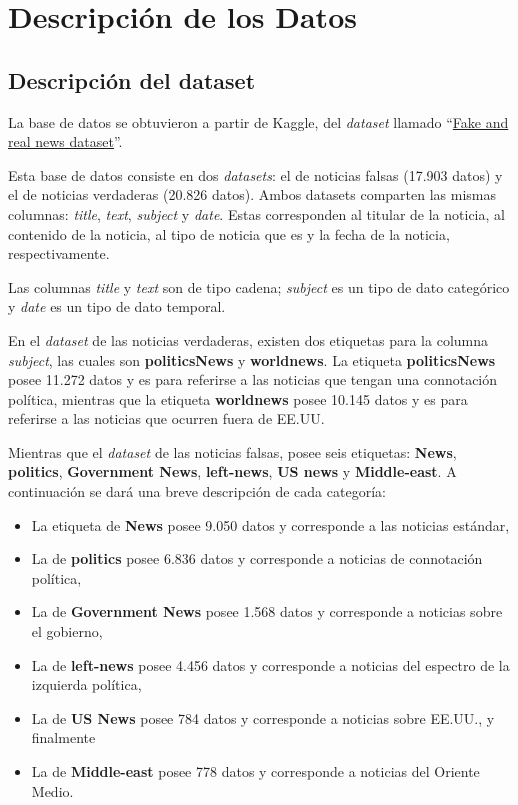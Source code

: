 \section{Descripción de los Datos}
{
\subsection{Descripción del dataset}
La base de datos se obtuvieron a partir de Kaggle, del \textit{dataset} llamado ``\href{https://www.kaggle.com/clmentbisaillon/fake-and-real-news-dataset}{Fake and 
real news dataset}''.

Esta base de datos consiste en dos \textit{datasets}: el de noticias falsas (17.903 datos) y el de noticias verdaderas (20.826 datos). Ambos datasets 
comparten las mismas columnas: \textit{title}, \textit{text}, \textit{subject} y \textit{date}. Estas corresponden al titular de
la noticia, al contenido de la noticia, al tipo de noticia que es y la fecha de la noticia, respectivamente.

Las columnas \textit{title} y \textit{text} son de tipo cadena; \textit{subject} es un tipo de dato categórico y \textit{date}
es un tipo de dato temporal. 

En el \textit{dataset} de las noticias verdaderas, existen dos etiquetas para la columna \textit{subject}, las cuales son \textbf{politicsNews} y \textbf{worldnews}. La etiqueta \textbf{politicsNews} posee 11.272 datos y es para referirse a las noticias que tengan una connotación política, mientras que la etiqueta \textbf{worldnews} posee 10.145 datos y es para referirse a las noticias que ocurren fuera de EE.UU.

Mientras que el \textit{dataset} de las noticias falsas, posee seis etiquetas:
\textbf{News}, \textbf{politics}, \textbf{Government News}, \textbf{left-news}, \textbf{US news} y \textbf{Middle-east}. A continuación se dará una breve descripción de cada categoría:
\begin{itemize}
    \item La etiqueta de \textbf{News} posee 9.050 datos y corresponde a las noticias estándar,
    \item La de \textbf{politics} posee 6.836 datos y corresponde a noticias de connotación política,
    \item La de \textbf{Government News} posee 1.568 datos y corresponde a noticias sobre el gobierno,
    \item La de \textbf{left-news} posee 4.456 datos y corresponde a noticias del espectro de la izquierda política,
    \item La de \textbf{US News} posee 784 datos y corresponde a noticias sobre EE.UU., y finalmente
    \item La de \textbf{Middle-east} posee 778 datos y corresponde a noticias del Oriente Medio.
\end{itemize}

}
